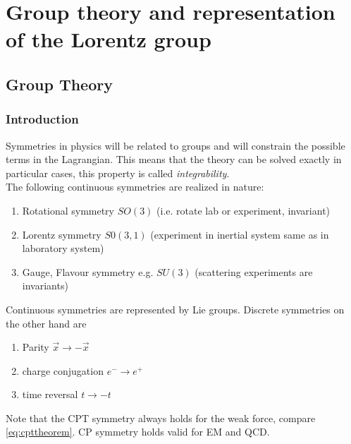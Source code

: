\chapter{Group theory and representation of the Lorentz group}
\section{Group Theory}
\subsection{Introduction}
Symmetries in physics will be related to groups and will constrain the possible terms in the Lagrangian. This means that the theory can be solved exactly in particular cases, this property is called \emph{integrability}.\\
The following continuous symmetries are realized in nature:
\begin{enumerate}
	\item Rotational symmetry $SO(3)$ (i.e. rotate lab or experiment, invariant)
	\item Lorentz symmetry $S0(3,1)$ (experiment in inertial system same as in laboratory system)
	\item Gauge, Flavour symmetry e.g. $SU(3)$ (scattering experiments are invariants)
\end{enumerate}
Continuous symmetries are represented by Lie groups. Discrete symmetries on the other hand are
\begin{enumerate}
	\item Parity $\vec{x}\rightarrow-\vec{x}$
	\item charge conjugation $e^- \rightarrow e^+$
	\item time reversal $t \rightarrow-t$
\end{enumerate}
Note that the CPT symmetry always holds for the weak force, compare \ref{eq:cpttheorem}. CP symmetry holds valid for EM and QCD.
